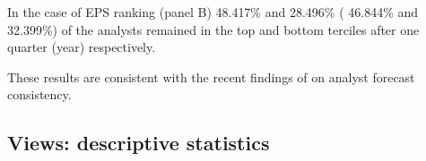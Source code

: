 \documentclass{article}\usepackage[]{graphicx}\usepackage[]{color}
\begin{document}
In the case of EPS ranking  (panel B) 48.417\% and  28.496\% ( 46.844\% and  32.399\%) of the analysts  remained in the top and bottom terciles after one quarter (year)  respectively.

These results are consistent with the recent findings of \cite{hilary2013} on analyst forecast consistency. 






\subsection{Views: descriptive statistics}
\end{document}
